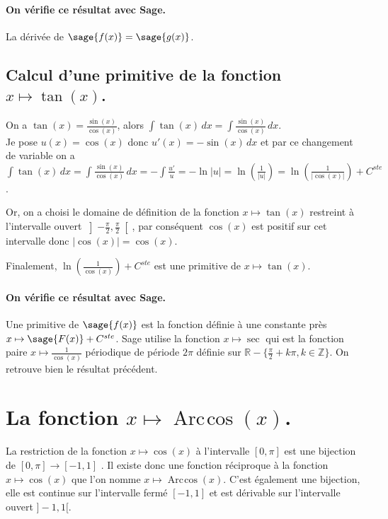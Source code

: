 \documentclass[a4paper,12pt]{report}
\def\eclaire{\mathbb}
\def\R{\ensuremath{\eclaire R}}
\def\Z{\ensuremath{\eclaire Z}}
\renewcommand{\arccos}{\mathop{\mathrm{Arc\mspace{2mu}cos}}}
\begin{document}
\paragraph{On vérifie ce résultat avec Sage.}
La dérivée de $\sage{f(x)} = \sage{g(x)} $.


\subsection{Calcul d'une primitive de la fonction  $x \mapsto \tan(x)$.}
On a $\tan(x)=\frac{\sin(x)}{\cos(x)}$, alors $\int \tan(x) \, dx =\int \frac{\sin(x)}{\cos(x)}\, dx$.\\
Je pose $u(x)=\cos(x)$ donc $u'(x)= -\sin(x) \,dx$ et par ce changement de variable on a $\int \tan(x) \, dx = \int \frac{\sin(x)}{\cos(x)}\, dx  = -\int \frac{u'}{u} = -\ln|u|  = \ln\left(\frac{1}{|u|}\right)  = \ln\left(\frac{1}{|\cos(x)|}\right) +C^{ste}$.

Or, on a choisi le domaine de définition de la fonction $x \mapsto \tan(x)$ restreint à l'intervalle ouvert $ \left] -\frac{\pi}{ 2} , \frac{\pi}{ 2} \right[ $, par conséquent $\cos(x)$ est positif sur cet intervalle donc $|\cos(x)| = \cos(x)$.

Finalement, $ \ln\left(\frac{1}{\cos(x)}\right) +C^{ste}$ est une primitive de $x \mapsto \tan(x)$.
\paragraph{On vérifie ce résultat avec Sage.}
Une primitive de $\sage{f(x)}$ est la fonction définie à une constante près $x \mapsto \sage{F(x)} + C^{ste} $.
Sage utilise la fonction $x\mapsto \sec$ qui est la fonction paire $x\mapsto \frac{1}{\cos(x)}$ périodique de période $2\pi$ définie sur $\R-\{ \frac{\pi}{2}+k\pi, k\in\Z\}$. On retrouve bien le résultat précédent.





\section{La fonction  $x \mapsto \arccos(x) $.}
La restriction de la fonction $x \mapsto \cos(x) $ à l'intervalle $[0,\pi]$ est une bijection de $[0,\pi] \rightarrow [-1,1]$ . Il existe donc une fonction réciproque à la fonction $x \mapsto \cos(x) $ que l'on nomme $x \mapsto \arccos(x) $. C'est également une bijection, elle est continue sur l'intervalle fermé  $ [-1,1]$ et est dérivable sur l'intervalle ouvert $]-1,1[$.
\end{document}
